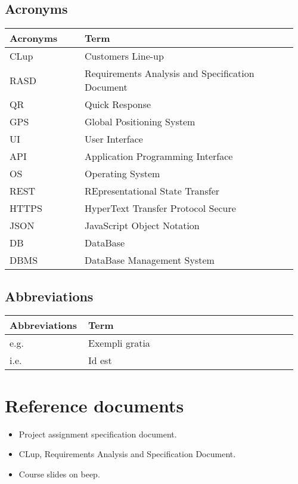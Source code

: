 \subsection{Acronyms}
\begin{center}
	\begin{tabular}{@{}p{0.25\linewidth} p{0.71\linewidth}@{}}
		\toprule
		\textbf{Acronyms} & \textbf{Term}\\
		\midrule
		CLup & Customers Line-up\\
		RASD & Requirements Analysis and Specification Document\\
		QR & Quick Response\\
		GPS & Global Positioning System\\
		UI & User Interface\\
		API & Application Programming Interface\\
		OS & Operating System\\
		REST & REpresentational State Transfer\\
		HTTPS & HyperText Transfer Protocol Secure\\
		JSON & JavaScript Object Notation\\	
		DB & DataBase\\
		DBMS & DataBase Management System\\
		\bottomrule
	\end{tabular}
\end{center}

\subsection{Abbreviations}
\begin{center}
	\begin{tabular}{@{}p{0.25\linewidth} p{0.71\linewidth}@{}}
		\toprule
		\textbf{Abbreviations} & \textbf{Term}\\
		\midrule
		e.g. & Exempli gratia\\
		i.e. & Id est\\
		\bottomrule
	\end{tabular}
\end{center}

\section{Reference documents}
\begin{itemize}
	\item Project assignment specification document.
    \item CLup, Requirements Analysis and Specification Document.
	\item Course slides on beep.
\end{itemize}

